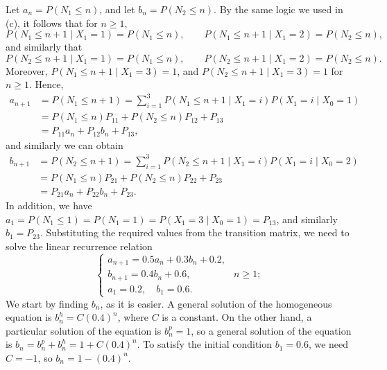 \documentclass{homework}
\begin{document}
\begin{alphaparts}
		\questionpart Let $a_n = P(N_1 \le n)$, and let $b_n = P(N_2 \le n)$. By the same logic we used in (c), it follows that for $n \ge 1$,
		\begin{equation*}
			P(N_1 \le n+1 \mid X_1=1) = P(N_1 \le n), \qquad P(N_1 \le n+1 \mid X_1 = 2) = P(N_2 \le n),
		\end{equation*}
		and similarly that
		\begin{equation*}
			P(N_2 \le n+1 \mid X_1=1) = P(N_1 \le n), \qquad P(N_2 \le n+1 \mid X_1 = 2) = P(N_2 \le n).
		\end{equation*}
		Moreover, $P(N_1 \le n+1\mid X_1=3) = 1$, and $P(N_2 \le n+1\mid X_1=3) = 1$ for $n \ge 1$. Hence,
		\begin{align*}
			a_{n+1} &= P(N_1 \le n+1) = \sum_{i=1}^3P(N_1 \le n+1 \mid X_1= i)P(X_1=i\mid X_0=1) \\
			&= P(N_1 \le n)P_{11} + P(N_2 \le n)P_{12} + P_{13} \\
			&= P_{11}a_n + P_{12}b_n + P_{13},
		\end{align*}
		and similarly we can obtain
		\begin{align*}
			b_{n+1} &= P(N_2 \le n+1) = \sum_{i=1}^3P(N_2 \le n+1 \mid X_1= i)P(X_1=i\mid X_0=2) \\
			&= P(N_1 \le n)P_{21} + P(N_2 \le n)P_{22} + P_{23} \\
			&= P_{21}a_n + P_{22}b_n + P_{23}.
		\end{align*}
		In addition, we have $a_1 = P(N_1 \le 1) = P(N_1 = 1) = P(X_1=3 \mid X_0 =1) = P_{13}$, and similarly $b_1 = P_{23}$. Substituting the required values from the transition matrix, we need to solve the linear recurrence relation
		\begin{equation*}
		\begin{cases}
			a_{n+1} = 0.5a_n + 0.3b_n + 0.2, &\\
			b_{n+1} = 0.4b_n + 0.6, & n\ge 1;\\
			a_1 = 0.2,\quad b_1 = 0.6.
		\end{cases}	
		\end{equation*}
		We start by finding $b_n$, as it is easier. A general solution of the homogeneous equation is $b^h_n = C(0.4)^n$, where $C$ is a constant. On the other hand, a particular solution of the equation is $b^p_n = 1$, so a general solution of the equation is $b_n = b^p_n+ b^h_n = 1 + C(0.4)^n$. To satisfy the initial condition $b_1 = 0.6$, we need $C = -1$, so $b_n = 1 - (0.4)^n$.
		

\end{alphaparts}
\end{document}
